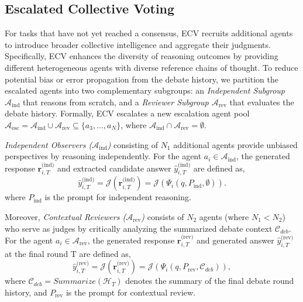 \documentclass[11pt]{article}
\begin{document}
\subsection{Escalated Collective Voting}
\label{sec:stage3}

For tasks that have not yet reached a consensus, 
ECV recruits additional agents to introduce broader collective intelligence and aggregate their judgments. 
Specifically, ECV enhances the diversity of reasoning outcomes by providing different heterogeneous agents with diverse reference chains of thought.
To reduce potential bias or error propagation from the debate history, we partition the escalated agents into two complementary subgroups: an \emph{Independent Subgroup  $\mathcal{A}_{\text{ind}}$} that reasons from scratch, and a \emph{Reviewer Subgroup $\mathcal{A}_{\text{rev}}$} that evaluates the debate history. 
Formally, ECV escalates a new escalation agent pool 
$\mathcal{A}_{\text{esc}}=\mathcal{A}_{\text{ind}}\cup\mathcal{A}_{\text{rev}}\subseteq\{a_3,\dots,a_N\}$, where
$\mathcal{A}_{\text{ind}}\cap\mathcal{A}_{\text{rev}}=\emptyset$.

\emph{Independent Observers ($\mathcal{A}_{\text{ind}}$)} consisting of $N_1$ additional agents provide unbiased perspectives by reasoning independently.
For the agent $a_i \in \mathcal{A}_{\text{ind}}$, 
the generated response $\boldsymbol{r}_{i,T}^{\text{(ind)}}$ and extracted candidate answer $\hat{y}_{i,T}^{\text{(ind)}}$ are defined as,
\begin{equation}
\hat{y}_{i,T}^{\text{(ind)}} = \mathcal{J}(\boldsymbol{r}_{i,T}^{\text{(ind)}})=\mathcal{J}(\Psi_i(q, P_{\text{ind}}, \emptyset)).
\end{equation}
where $P_{\text{ind}}$ is the prompt for independent reasoning.

Moreover, \emph{Contextual Reviewers ($\mathcal{A}_{\text{rev}}$)} consists of  $N_2$ agents (where $N_1 < N_2$) who serve as judges by critically analyzing the summarized debate context $\mathcal{C}_{deb}$. For the agent $a_i \in \mathcal{A}_{\text{rev}}$, the generated response $\boldsymbol{r}_{i,T}^{\text{(rev)}}$ and generated answer $\hat{y}_{i,T}^{\text{(rev)}}$ at the final round T are defined as,
\begin{equation}
\hat{y}_{i,T}^{\text{(rev)}} = \mathcal{J}(\boldsymbol{r}_{i,T}^{\text{(rev)}})=\mathcal{J}(\Psi_i(q, P_{\text{rev}}, \mathcal{C}_{deb} )),
\end{equation}
where $\mathcal{C}_{deb}=Summarize(\mathcal{H}_T)$  denotes the summary of the final debate round history, and  $P_{\text{rev}}$ is the prompt for contextual review.
\end{document}

